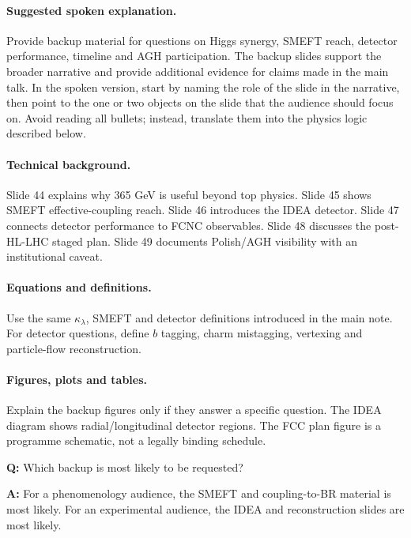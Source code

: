 \documentclass[11pt,a4paper]{report}
\begin{document}
\paragraph{Suggested spoken explanation.}
Provide backup material for questions on Higgs synergy, SMEFT reach, detector performance, timeline and AGH participation. The backup slides support the broader narrative and provide additional evidence for claims made in the main talk. In the spoken version, start by naming the role of the slide in the narrative, then point to the one or two objects on the slide that the audience should focus on.  Avoid reading all bullets; instead, translate them into the physics logic described below.

\paragraph{Technical background.}
Slide 44 explains why 365 GeV is useful beyond top physics.  Slide 45 shows SMEFT effective-coupling reach.  Slide 46 introduces the IDEA detector.  Slide 47 connects detector performance to FCNC observables.  Slide 48 discusses the post-HL-LHC staged plan.  Slide 49 documents Polish/AGH visibility with an institutional caveat.

\paragraph{Equations and definitions.}
Use the same $\kappa_\lambda$, SMEFT and detector definitions introduced in the main note.  For detector questions, define $b$ tagging, charm mistagging, vertexing and particle-flow reconstruction.

\paragraph{Figures, plots and tables.}
Explain the backup figures only if they answer a specific question.  The IDEA diagram shows radial/longitudinal detector regions.  The FCC plan figure is a programme schematic, not a legally binding schedule.

\begin{questionbox}
\textbf{Q:} Which backup is most likely to be requested?\par
\textbf{A:} For a phenomenology audience, the SMEFT and coupling-to-BR material is most likely.  For an experimental audience, the IDEA and reconstruction slides are most likely.
\end{questionbox}
\end{document}
